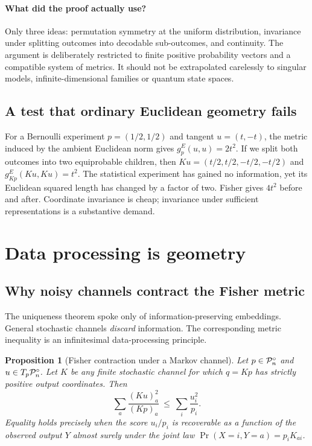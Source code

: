 \documentclass[11pt]{article}
\newtheorem{proposition}[theorem]{Proposition}
\theoremstyle{definition}\newtheorem{definition}[theorem]{Definition}\newtheorem{exercise}{Problem}[section]
\begin{document}
\paragraph{What did the proof actually use?} Only three ideas: permutation symmetry at the uniform distribution, invariance under splitting outcomes into decodable sub-outcomes, and continuity. The argument is deliberately restricted to finite positive probability vectors and a compatible system of metrics. It should not be extrapolated carelessly to singular models, infinite-dimensional families or quantum state spaces.

\subsection{A test that ordinary Euclidean geometry fails}

For a Bernoulli experiment $p=(1/2,1/2)$ and tangent $u=(t,-t)$, the metric induced by the ambient Euclidean norm gives $g^E_p(u,u)=2t^2$. If we split both outcomes into two equiprobable children, then $Ku=(t/2,t/2,-t/2,-t/2)$ and $g^E_{Kp}(Ku,Ku)=t^2$. The statistical experiment has gained no information, yet its Euclidean squared length has changed by a factor of two. Fisher gives $4t^2$ before and after. Coordinate invariance is cheap; invariance under sufficient representations is a substantive demand.

\section{Data processing is geometry}\label{sec:processing}

\subsection{Why noisy channels contract the Fisher metric}

The uniqueness theorem spoke only of information-preserving embeddings. General stochastic channels \emph{discard} information. The corresponding metric inequality is an infinitesimal data-processing principle.

\begin{proposition}[Fisher contraction under a Markov channel]\label{prop:contraction}
Let $p\in\mathcal P_n^\circ$ and $u\in T_p\mathcal P_n^\circ$. Let $K$ be any finite stochastic channel for which $q=Kp$ has strictly positive output coordinates. Then
\begin{equation}\label{eq:contraction}
 \sum_a\frac{(Ku)_a^2}{(Kp)_a}\ \leq\ \sum_i\frac{u_i^2}{p_i}.
\end{equation}
Equality holds precisely when the score $u_i/p_i$ is recoverable as a function of the observed output $Y$ almost surely under the joint law $\Pr(X=i,Y=a)=p_iK_{ai}$.
\end{proposition}
\end{document}
